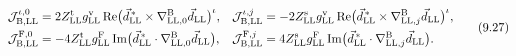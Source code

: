 \documentclass[
  10pt,
]{article}
\begin{document}
\[\begin{aligned}\mathcal J^{\iota,0}_{{\rm B},{\rm LL}}&=2Z^{\rm t}_{\rm LL}g^{\rm v}_{\rm LL}\,{\rm Re}\big(\vec d^{\,*}_{\rm LL}\times\nabla^{\rm B}_{{\rm LL},0}\vec d_{\rm LL}\big)^\iota,&\mathcal J^{\iota,j}_{{\rm B},{\rm LL}}&=-2Z^{\rm s}_{\rm LL}g^{\rm v}_{\rm LL}\,{\rm Re}\big(\vec d^{\,*}_{\rm LL}\times\nabla^{\rm B}_{{\rm LL},j}\vec d_{\rm LL}\big)^\iota,\\\mathcal J^{{\rm F},0}_{{\rm B},{\rm LL}}&=-4Z^{\rm t}_{\rm LL}g^{\rm F}_{\rm LL}\,{\rm Im}\big(\vec d^{\,*}_{\rm LL}\cdot\nabla^{\rm B}_{{\rm LL},0}\vec d_{\rm LL}\big),&\mathcal J^{{\rm F},j}_{{\rm B},{\rm LL}}&=4Z^{\rm s}_{\rm LL}g^{\rm F}_{\rm LL}\,{\rm Im}\big(\vec d^{\,*}_{\rm LL}\cdot\nabla^{\rm B}_{{\rm LL},j}\vec d_{\rm LL}\big).\end{aligned}\tag{9.27}\]
\end{document}
